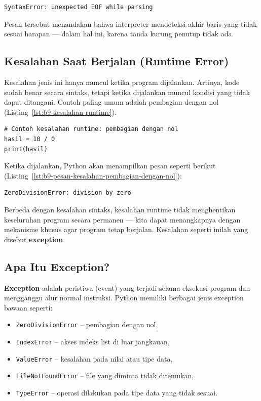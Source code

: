 \begin{lstlisting}[language=bash, caption={Pesan kesalahan sintaks}, label={lst:b9-pesan-kesalahan-sintaks}]
SyntaxError: unexpected EOF while parsing
\end{lstlisting}

Pesan tersebut menandakan bahwa interpreter mendeteksi akhir baris yang tidak sesuai harapan — dalam hal ini, karena tanda kurung penutup tidak ada.

\subsection*{Kesalahan Saat Berjalan (Runtime Error)}

Kesalahan jenis ini hanya muncul ketika program dijalankan. Artinya, kode sudah benar secara sintaks, tetapi ketika dijalankan muncul kondisi yang tidak dapat ditangani. Contoh paling umum adalah pembagian dengan nol (Listing~\ref{lst:b9-kesalahan-runtime}).

\begin{lstlisting}[style=PythonStyle, caption={Contoh kesalahan runtime}, label={lst:b9-kesalahan-runtime}]
# Contoh kesalahan runtime: pembagian dengan nol
hasil = 10 / 0
print(hasil)
\end{lstlisting}

Ketika dijalankan, Python akan menampilkan pesan seperti berikut (Listing~\ref{lst:b9-pesan-kesalahan-pembagian-dengan-nol}):

\begin{lstlisting}[language=bash, caption={Pesan kesalahan pembagian dengan nol}, label={lst:b9-pesan-kesalahan-pembagian-dengan-nol}]
ZeroDivisionError: division by zero
\end{lstlisting}

Berbeda dengan kesalahan sintaks, kesalahan runtime tidak menghentikan keseluruhan program secara permanen — kita dapat menangkapnya dengan mekanisme khusus agar program tetap berjalan. Kesalahan seperti inilah yang disebut \textbf{exception}.

\subsection*{Apa Itu Exception?}

\textbf{Exception} adalah peristiwa (event) yang terjadi selama eksekusi program dan mengganggu alur normal instruksi. Python memiliki berbagai jenis exception bawaan seperti:

\begin{itemize}
    \item \texttt{ZeroDivisionError} – pembagian dengan nol,
    \item \texttt{IndexError} – akses indeks list di luar jangkauan,
    \item \texttt{ValueError} – kesalahan pada nilai atau tipe data,
    \item \texttt{FileNotFoundError} – file yang diminta tidak ditemukan,
    \item \texttt{TypeError} – operasi dilakukan pada tipe data yang tidak sesuai.
\end{itemize}

